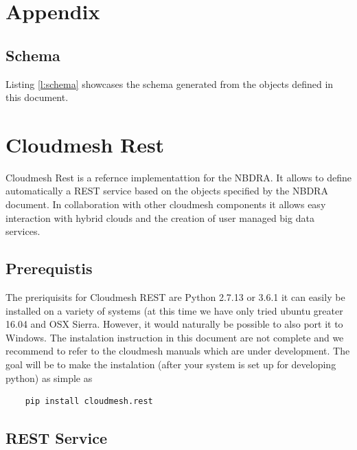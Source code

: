 \documentclass[10pt]{article}
\begin{document}
\newpage

\appendix

\section{Appendix}

\subsection{Schema}\label{s:schema}

Listing \ref{l:schema} showcases the schema generated from the objects
defined in this document.


\section{Cloudmesh Rest}\label{s:cloudmesh-rest}

Cloudmesh Rest is a refernce implementattion for the NBDRA. It
allows to define automatically a REST service based on the objects
specified by the NBDRA document. In collaboration with other cloudmesh
components it allows easy interaction with hybrid clouds and the
creation of user managed big data services. 

\subsection{Prerequistis}\label{prerequistis}

The preriquisits for Cloudmesh REST are Python 2.7.13 or 3.6.1
it can easily be installed on a variety of systems (at this time we
have only tried ubuntu greater 16.04 and OSX Sierra. However, it would
naturally be possible to also port it to Windows. The instalation
instruction in this document are not complete and we recommend to
refer to the cloudmesh manuals which are under development. The goal
will be to make the instalation (after your system is set up for
developing python) as simple as 

\begin{verbatim}
    pip install cloudmesh.rest
\end{verbatim}


\subsection{REST Service}\label{cm-rest}
\end{document}

